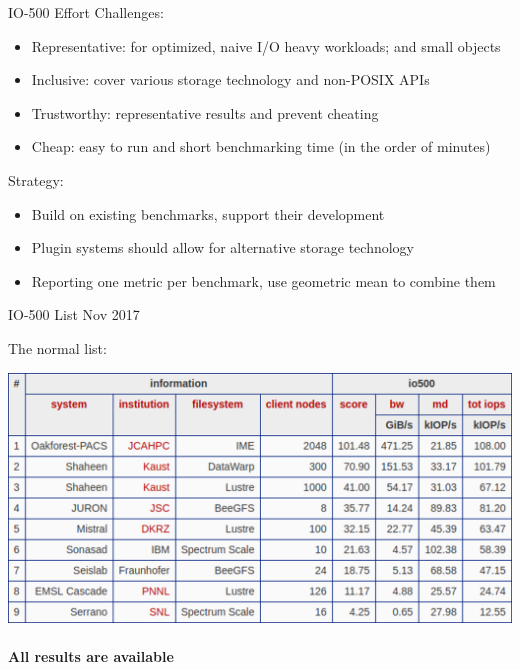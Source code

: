 \documentclass[portrait,a0paper,fontscale=0.4]{baposter}
\begin{document}
\begin{poster}
\begin{posterbox}[name=io500,column=1,span=2]{IO-500 Effort}
Challenges:
\vspace*{-1em}
\begin{itemize}
\item Representative: for optimized, naive I/O heavy workloads; and small objects
\item Inclusive: cover various storage technology and non-POSIX APIs
\item Trustworthy: representative results and prevent cheating
\item Cheap: easy to run and short benchmarking time (in the order of minutes)
\end{itemize}

\vspace*{-1em}

Strategy:
\vspace*{-1em}
\begin{itemize}
\item Build on existing benchmarks, support their development
\item Plugin systems should allow for alternative storage technology
\item Reporting one metric per benchmark, use geometric mean to combine them
\end{itemize}


\end{posterbox}


\begin{posterbox}[name=io500res,column=1,above=bottom,below=io500]{IO-500 List Nov 2017}


The normal list:

  \includegraphics[width=\textwidth]{io500}

\vspace*{-1em}

\paragraph{All results are available}


\end{posterbox}
\end{poster}
\end{document}
